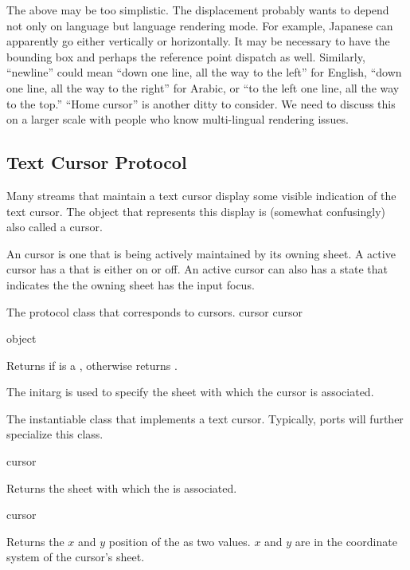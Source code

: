  {The above may be too simplistic. The displacement probably
wants to depend not only on language but language rendering mode.  For example,
Japanese can apparently go either vertically or horizontally.  It may be
necessary to have the bounding box and perhaps the reference point dispatch as
well.  Similarly, ``newline'' could mean ``down one line, all the way to the
left'' for English, ``down one line, all the way to the right'' for Arabic, or
``to the left one line, all the way to the top.''  ``Home cursor'' is another
ditty to consider.  We need to discuss this on a larger scale with people who
know multi-lingual rendering issues.}


\subsection {Text Cursor Protocol}

Many streams that maintain a text cursor display some visible indication of the
text cursor.  The object that represents this display is (somewhat confusingly)
also called a cursor.

An  cursor is one that is being actively maintained by its
owning sheet.  A active cursor has a  that is either on or off.
An active cursor can also has a state that indicates the the owning sheet has
the input focus.


The protocol class that corresponds to cursors.
 {cursor} {cursor}
\Mutable

 {object}

Returns  if  is a , otherwise returns
.


The  initarg is used to specify the sheet with which the cursor is
associated.


The instantiable class that implements a text cursor.  Typically, ports will
further specialize this class.

 {cursor}

Returns the sheet with which the   is associated.

 {cursor}

Returns the $x$ and $y$ position of the   as two
values.  $x$ and $y$ are in the coordinate system of the cursor's sheet.

